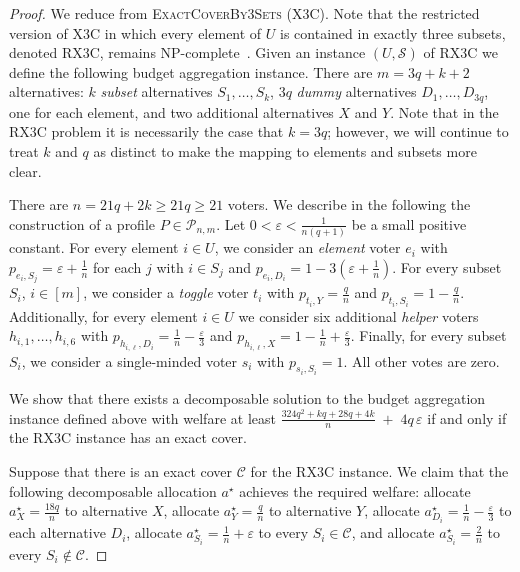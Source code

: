 \documentclass[11pt]{article}
\begin{document}
\begin{proof}
We reduce from \textsc{ExactCoverBy3Sets} (X3C).
Note that the restricted version of X3C in which every element of $U$ is contained in exactly three subsets, denoted RX3C, remains NP-complete~\citep{gonzalez1985clustering}.  Given an instance $(U, \mathcal{S})$ of RX3C we define the following budget aggregation instance. There are $m=3q+k+2$ alternatives: $k$ \emph{subset} alternatives $S_1, \ldots, S_k$, $3q$ \emph{dummy} alternatives $D_1, \ldots, D_{3q}$, one for each element, and two additional alternatives $X$ and $Y$. Note that in the RX3C problem it is necessarily the case that $k=3q$; however, we will continue to treat $k$ and $q$ as distinct to make the mapping to elements and subsets more clear.

There are $n=21q+2k \ge 21q \geq 21$ voters. 
We describe in the following the construction of a profile $P\in \mathcal{P}_{n,m}$. 
Let $0<\varepsilon<\frac{1}{n(q+1)}$ be a small positive constant. For every element $i \in U$, we consider an \emph{element} voter $e_i$ with $p_{e_i,S_j}=\varepsilon+\frac{1}{n}$ for each $j$ with $i \in S_j$ and $p_{e_i,D_i}=1-3(\varepsilon+\frac{1}{n})$. For every subset $S_i$, $i \in [m]$, we consider a \emph{toggle} voter $t_i$ with $p_{t_i,Y}=\frac{q}{n}$ and $p_{t_i,S_i}=1-\frac{q}{n}$. Additionally, for every element $i \in U$ we consider six additional \emph{helper} voters $h_{i,1},\ldots, h_{i,6}$ with $p_{h_{i,\ell},D_i}=\frac{1}{n}-\frac{\varepsilon}{3}$ and $p_{h_{i,\ell},X}=1-\frac{1}{n}+\frac{\varepsilon}{3}$. Finally, for every subset $S_i$, we consider a single-minded voter $s_i$ with $p_{s_i,S_i}=1$. All other votes are zero.

We show that there exists a decomposable solution to the budget aggregation instance defined above with welfare at least $\frac{324q^{2} + kq + 28q + 4k}{n} \;+\; 4q\,\varepsilon$ if and only if the RX3C instance has an exact cover.

Suppose that there is an exact cover $\mathcal{C}$ for the RX3C instance. We claim that the following decomposable allocation $a^\star$ achieves the required welfare: allocate $a^\star_X = \frac{18q}{n}$ to alternative $X$, allocate $a^\star_Y = \frac{q}{n}$ to alternative $Y$, allocate $a^\star_{D_i} = \frac{1}{n}-\frac{\varepsilon}{3}$ to each alternative $D_i$, allocate $a^\star_{S_i}=\frac{1}{n}+\varepsilon$ to every $S_i \in \mathcal{C}$, and allocate $a^\star_{S_i}=\frac{2}{n}$ to every $S_i \not \in \mathcal{C}$. 


\end{proof}
\end{document}
